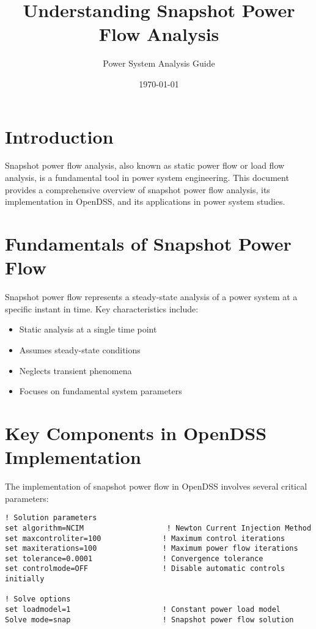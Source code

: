 \documentclass[11pt]{article}
\title{Understanding Snapshot Power Flow Analysis}
\author{Power System Analysis Guide}
\date{\today}
\begin{document}
\maketitle

\section{Introduction}
Snapshot power flow analysis, also known as static power flow or load flow analysis, is a fundamental tool in power system engineering. This document provides a comprehensive overview of snapshot power flow analysis, its implementation in OpenDSS, and its applications in power system studies.

\section{Fundamentals of Snapshot Power Flow}
Snapshot power flow represents a steady-state analysis of a power system at a specific instant in time. Key characteristics include:
\begin{itemize}
    \item Static analysis at a single time point
    \item Assumes steady-state conditions
    \item Neglects transient phenomena
    \item Focuses on fundamental system parameters
\end{itemize}

\section{Key Components in OpenDSS Implementation}
The implementation of snapshot power flow in OpenDSS involves several critical parameters:

\begin{lstlisting}
! Solution parameters
set algorithm=NCIM                   ! Newton Current Injection Method
set maxcontroliter=100              ! Maximum control iterations
set maxiterations=100               ! Maximum power flow iterations
set tolerance=0.0001                ! Convergence tolerance
set controlmode=OFF                 ! Disable automatic controls initially

! Solve options
set loadmodel=1                     ! Constant power load model
Solve mode=snap                     ! Snapshot power flow solution
\end{lstlisting}
\end{document}
